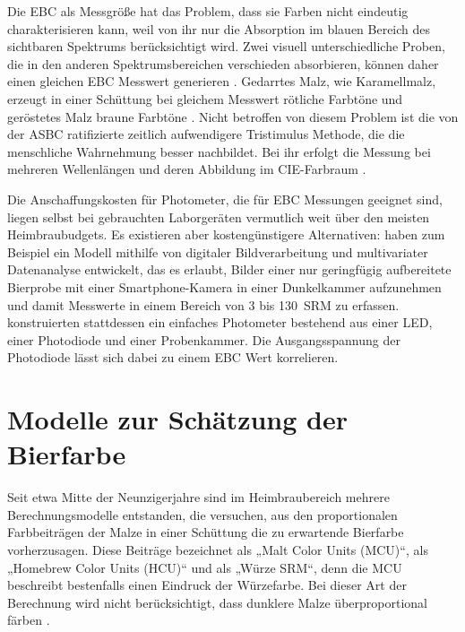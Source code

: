 \documentclass[a4paper,parskip=half]{scrartcl}
\begin{document}
Die EBC als Messgröße hat das Problem, dass sie Farben nicht eindeutig charakterisieren kann, weil von ihr nur die Absorption im blauen Bereich des sichtbaren Spektrums berücksichtigt wird. Zwei visuell unterschiedliche Proben, die in den anderen Spektrumsbereichen verschieden absorbieren, können daher einen gleichen EBC Messwert generieren \parencite{Shellhammer2009}. Gedarrtes Malz, wie Karamellmalz, erzeugt in einer Schüttung bei gleichem Messwert rötliche Farbtöne und geröstetes Malz braune Farbtöne \parencites{Tucker2017}{Bies2020}. Nicht betroffen von diesem Problem ist die von der ASBC ratifizierte zeitlich aufwendigere Tristimulus Methode, die die menschliche Wahrnehmung besser nachbildet. Bei ihr erfolgt die Messung bei mehreren Wellenlängen und deren Abbildung im CIE-Farbraum \parencite{Shellhammer2009}.

Die Anschaffungskosten für Photometer, die für EBC Messungen geeignet sind, liegen selbst bei gebrauchten Laborgeräten vermutlich weit über den meisten Heimbraubudgets. Es existieren aber kostengünstigere Alternativen: \textcite{Fulgencio2019} haben zum Beispiel ein Modell mithilfe von digitaler Bildverarbeitung und multivariater Datenanalyse entwickelt, das es erlaubt, Bilder einer nur geringfügig aufbereitete Bierprobe mit einer Smartphone-Kamera in einer Dunkelkammer aufzunehmen und damit Messwerte in einem Bereich von 3 bis 130~SRM zu erfassen. \textcite{Caro2019} konstruierten stattdessen ein einfaches Photometer bestehend aus einer LED, einer Photodiode und einer Probenkammer. Die Ausgangsspannung der Photodiode lässt sich dabei zu einem EBC Wert korrelieren.

\section*{Modelle zur Schätzung der Bierfarbe}

Seit etwa Mitte der Neunzigerjahre sind im Heimbraubereich mehrere Berechnungsmodelle entstanden, die versuchen, aus den proportionalen Farbbeiträgen der Malze in einer Schüttung die zu erwartende Bierfarbe vorherzusagen. Diese Beiträge bezeichnet \textcite[61]{Daniels1996} als „Malt Color Units (MCU)“, \textcite[34]{Mosher1994} als „Homebrew Color Units (HCU)“  und \textcite[10]{Holle2010} als „Würze SRM“, denn die MCU beschreibt bestenfalls einen Eindruck der Würzefarbe. Bei dieser Art der Berechnung wird nicht berücksichtigt, dass dunklere Malze überproportional färben \parencite{KrausWeyermann2021c}.
\end{document}
